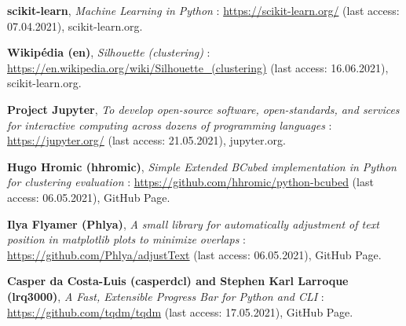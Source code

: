 \begin{thebibliography}{9}
\textbf{scikit-learn},
\textit{Machine Learning in Python} : \url{https://scikit-learn.org/} (last access: 07.04.2021),
scikit-learn.org.

\textbf{Wikipédia (en)},
\textit{Silhouette (clustering)} : \url{https://en.wikipedia.org/wiki/Silhouette_(clustering)} (last access: 16.06.2021),
scikit-learn.org.

\textbf{Project Jupyter},
\textit{To develop open-source software, open-standards, and services for interactive computing across dozens of programming languages} : \url{https://jupyter.org/} (last access: 21.05.2021),
jupyter.org.

\textbf{Hugo Hromic (hhromic)},
\textit{Simple Extended BCubed implementation in Python for clustering evaluation} : \url{https://github.com/hhromic/python-bcubed} (last access: 06.05.2021),
GitHub Page.

\textbf{Ilya Flyamer (Phlya)},
\textit{A small library for automatically adjustment of text position in matplotlib plots to minimize overlaps} : \url{https://github.com/Phlya/adjustText} (last access: 06.05.2021),
GitHub Page.

\textbf{Casper da Costa-Luis (casperdcl) and Stephen Karl Larroque (lrq3000)},
\textit{A Fast, Extensible Progress Bar for Python and CLI} : \url{https://github.com/tqdm/tqdm} (last access: 17.05.2021),
GitHub Page.

\end{thebibliography}
